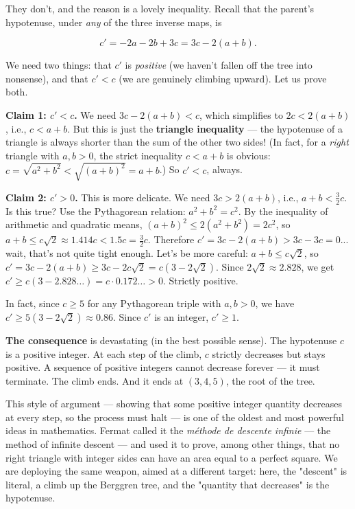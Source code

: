 They don't, and the reason is a lovely inequality. Recall that the parent's hypotenuse, under \textit{any} of the three inverse maps, is

\[
c' = -2a - 2b + 3c = 3c - 2(a + b).
\]

We need two things: that $c'$ is \textit{positive} (we haven't fallen off the tree into nonsense), and that $c' < c$ (we are genuinely climbing upward). Let us prove both.

\textbf{Claim 1: $c' < c$.} We need $3c - 2(a+b) < c$, which simplifies to $2c < 2(a+b)$, i.e., $c < a + b$. But this is just the \textbf{triangle inequality} --- the hypotenuse of a triangle is always shorter than the sum of the other two sides! (In fact, for a \textit{right} triangle with $a, b > 0$, the strict inequality $c < a + b$ is obvious: $c = \sqrt{a^2 + b^2} < \sqrt{(a+b)^2} = a + b$.) So $c' < c$, always.

\textbf{Claim 2: $c' > 0$.} This is more delicate. We need $3c > 2(a+b)$, i.e., $a + b < \frac{3}{2}c$. Is this true? Use the Pythagorean relation: $a^2 + b^2 = c^2$. By the inequality of arithmetic and quadratic means, $(a + b)^2 \leq 2(a^2 + b^2) = 2c^2$, so $a + b \leq c\sqrt{2} \approx 1.414c < 1.5c = \frac{3}{2}c$. Therefore $c' = 3c - 2(a+b) > 3c - 3c = 0$... wait, that's not quite tight enough. Let's be more careful: $a + b \leq c\sqrt{2}$, so $c' = 3c - 2(a+b) \geq 3c - 2c\sqrt{2} = c(3 - 2\sqrt{2})$. Since $2\sqrt{2} \approx 2.828$, we get $c' \geq c(3 - 2.828\ldots) = c \cdot 0.172\ldots > 0$. Strictly positive.

In fact, since $c \geq 5$ for any Pythagorean triple with $a, b > 0$, we have $c' \geq 5(3 - 2\sqrt{2}) \approx 0.86$. Since $c'$ is an integer, $c' \geq 1$.

\textbf{The consequence} is devastating (in the best possible sense). The hypotenuse $c$ is a positive integer. At each step of the climb, $c$ strictly decreases but stays positive. A sequence of positive integers cannot decrease forever --- it must terminate. The climb ends. And it ends at $(3, 4, 5)$, the root of the tree.

This style of argument --- showing that some positive integer quantity decreases at every step, so the process must halt --- is one of the oldest and most powerful ideas in mathematics. Fermat called it the \textit{méthode de descente infinie} --- the method of infinite descent --- and used it to prove, among other things, that no right triangle with integer sides can have an area equal to a perfect square. We are deploying the same weapon, aimed at a different target: here, the "descent" is literal, a climb up the Berggren tree, and the "quantity that decreases" is the hypotenuse.

